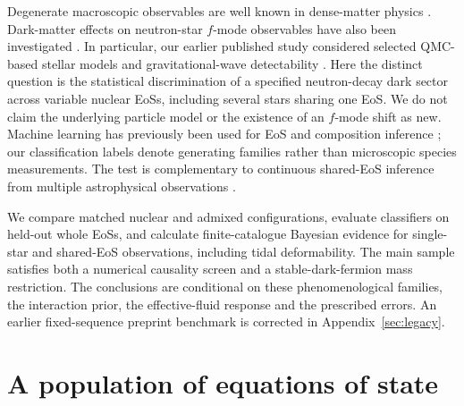 \documentclass[11pt,a4paper]{article}
\begin{document}
Degenerate macroscopic observables are well known in dense-matter physics \citep{Alford05}. Dark-matter effects on neutron-star $f$-mode observables have also been investigated \citep{Shirke24,HusainOsc}. In particular, our earlier published study considered selected QMC-based stellar models and gravitational-wave detectability \citep{HusainOsc}. Here the distinct question is the statistical discrimination of a specified neutron-decay dark sector across variable nuclear EoSs, including several stars sharing one EoS. We do not claim the underlying particle model or the existence of an $f$-mode shift as new. Machine learning has previously been used for EoS and composition inference \citep{Fujimoto18,Carvalho23,Carvalho24Hyp}; our classification labels denote generating families rather than microscopic species measurements. The test is complementary to continuous shared-EoS inference from multiple astrophysical observations \citep{LandryEssick19,Raaijmakers21,Miller21,Legred21}.

We compare matched nuclear and admixed configurations, evaluate classifiers on held-out whole EoSs, and calculate finite-catalogue Bayesian evidence for single-star and shared-EoS observations, including tidal deformability. The main sample satisfies both a numerical causality screen and a stable-dark-fermion mass restriction. The conclusions are conditional on these phenomenological families, the interaction prior, the effective-fluid response and the prescribed errors. An earlier fixed-sequence preprint benchmark is corrected in Appendix~\ref{sec:legacy}.
\section{A population of equations of state}\label{sec:pop}
\end{document}
